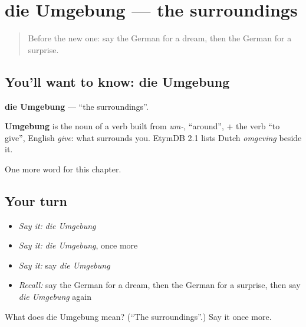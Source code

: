 \section[die Umgebung]{die Umgebung — the surroundings}

\label{lesson:GE-C240-umgebung}



\begin{quote}
Before the new one: say the German for a dream, then the German for a surprise.
\end{quote}

\subsection*{You'll want to know: die Umgebung}
\textbf{die Umgebung} — \textquotedblleft{}the surroundings\textquotedblright{}.

\begin{cousinweb}
\textbf{Umgebung} is the noun of a verb built from \emph{um-}, \textquotedblleft{}around\textquotedblright{}, + the verb \textquotedblleft{}to give\textquotedblright{}, English \emph{give}: what surrounds you. EtymDB 2.1 lists Dutch \emph{omgeving} beside it.
\end{cousinweb}

\begin{grammarlens}[title={What you've built}]
One more word for this chapter.
\end{grammarlens}

\subsection*{Your turn}
\begin{itemize}
\raggedright
  \item \emph{Say it:} \emph{die Umgebung}
  \item \emph{Say it:} \emph{die Umgebung}, once more
  \item \emph{Say it:} say \emph{die Umgebung}
  \item \emph{Recall:} say the German for a dream, then the German for a surprise, then say \emph{die Umgebung} again
\end{itemize}

\begin{tcolorbox}[breakable,colback=teal!4,colframe=teal!35!black,title={Before you move on}]
What does die Umgebung mean? (\textquotedblleft{}The surroundings\textquotedblright{}.) Say it once more.
\end{tcolorbox}
